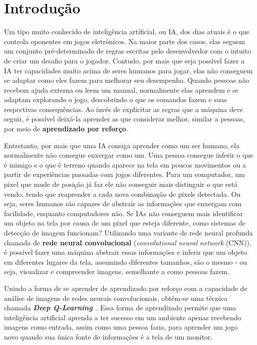 
\chapter{Introdução}
\label{cap:introducao}

Um tipo muito conhecido de inteligência artificial, ou IA, dos dias atuais é o que controla oponentes em jogos eletrônicos.
Na maior parte dos casos, elas seguem um conjunto pré-determinado de regras escritas pelo desenvolvedor com o intuito de criar um desafio para o jogador.
Contudo, por mais que seja possível fazer a IA ter capacidades muito acima de seres humanos para jogar, elas não conseguem se adaptar como eles fazem para melhorar seu desempenho.
Quando pessoas não recebem ajuda externa ou leem um manual, normalmente elas aprendem e se adaptam explorando o jogo, descobrindo o que os comandos fazem e suas respectivas consequências.
Ao invés de explicitar as regras que a máquina deve seguir, é possível deixá-la aprender as que considerar melhor, similar a pessoas, por meio de \textbf{aprendizado por reforço}.

Entretanto, por mais que uma IA consiga aprender como um ser humano, ela normalmente não consegue enxergar como um.
Uma pessoa consegue inferir o que é inimigo e o que é terreno quando aparece na tela em poucos movimentos ou a partir de experiências passadas com jogos diferentes.
Para um computador, um pixel que mude de posição já faz ele não conseguir mais distinguir o que está vendo, tendo que reaprender a cada nova combinação de pixels detectada.
Ou seja, seres humanos são capazes de abstrair as informações que enxergam com facilidade, enquanto computadores não.
Se IAs não conseguem mais identificar um objeto na tela por causa de um pixel que esteja diferente, como sistemas de detecção de imagem funcionam?
Utilizando uma variante de rede neural profunda chamada de \textbf{rede neural convolucional} (\textit{convolutional neural network} (CNN)), é possível fazer uma máquina abstrair essas informações e inferir que um objeto em diferentes lugares da tela, assumindo diferentes tamanhos, são o mesmo - ou seja, visualizar e compreender imagens, semelhante a como pessoas fazem.

Unindo a forma de se aprender de aprendizado por reforço com a capacidade de análise de imagens de redes neurais convolucionais, obtém-se uma técnica chamada \textit{\textbf{Deep Q-Learning}}~\cite{DBLP:journals/corr/MnihKSGAWR13}.
Essa forma de aprendizado permite que uma inteligência artificial aprenda a ter sucesso em um ambiente apenas recebendo imagens como entrada, assim como uma pessoa faria, para aprender um jogo novo quando sua única fonte de informações é a tela de um monitor.

